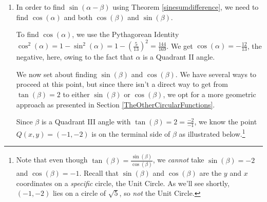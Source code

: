 \documentclass{ximera}
\begin{document}
\begin{example}
\begin{enumerate}
\item  In order to find $\sin(\alpha - \beta)$ using Theorem \ref{sinesumdifference}, we need to find $\cos(\alpha)$ and both $\cos(\beta)$ and $\sin(\beta)$.  

 

To find $\cos(\alpha)$, we use the Pythagorean Identity $\cos^2(\alpha) = 1 - \sin^{2}(\alpha) = 1 -  \left(\frac{5}{13}\right)^2 = \frac{144}{169}$.   We get $\cos(\alpha) = -\frac{12}{13}$, the negative, here, owing to the fact that $\alpha$ is a Quadrant II angle.

 

 We now set about finding $\sin(\beta)$ and $\cos(\beta)$.   We have several ways to proceed at this point, but since there isn't a direct way to get from $\tan(\beta)  = 2$ to either $\sin(\beta)$ or $\cos(\beta)$, we opt for a more geometric approach as presented in Section \ref{TheOtherCircularFunctions}. 
  
 
 Since $\beta$ is a Quadrant III angle with $\tan(\beta) = 2 = \frac{-2}{-1}$, we know the point $Q(x,y) = (-1,-2)$ is on the terminal side of $\beta$ as illustrated below.\footnote{Note that even though $\tan(\beta) = \frac{\sin(\beta)}{\cos(\beta)}$,  we \textit{cannot} take $\sin(\beta)=-2$ and $\cos(\beta) = -1$.   Recall that $\sin(\beta)$ and $\cos(\beta)$ are the $y$ and $x$ coordinates on a \textit{specific} circle, the Unit Circle.  As we'll see shortly, $(-1,-2)$ lies on a circle of $\sqrt{5}$, so \textit{not} the Unit Circle.}

\begin{image}
\end{image}
\end{enumerate}
\end{example}
\end{document}
